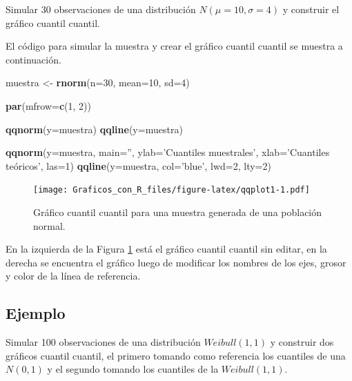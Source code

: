\documentclass[10pt,]{krantz}
\makeatletter
\newenvironment{Shaded}{\begin{snugshade}}{\end{snugshade}}
\newcommand{\KeywordTok}[1]{\textcolor[rgb]{0.13,0.29,0.53}{\textbf{{#1}}}}
\newcommand{\DataTypeTok}[1]{\textcolor[rgb]{0.13,0.29,0.53}{{#1}}}
\newcommand{\DecValTok}[1]{\textcolor[rgb]{0.00,0.00,0.81}{{#1}}}
\newcommand{\StringTok}[1]{\textcolor[rgb]{0.31,0.60,0.02}{{#1}}}
\newcommand{\NormalTok}[1]{{#1}}
\newenvironment{kframe}{%
\medskip{}
\setlength{\fboxsep}{.8em}
 \def\at@end@of@kframe{}%
 \ifinner\ifhmode%
  \def\at@end@of@kframe{\end{minipage}}%
  \begin{minipage}{\columnwidth}%
 \fi\fi%
 \def\FrameCommand##1{\hskip\@totalleftmargin \hskip-\fboxsep
 \colorbox{shadecolor}{##1}\hskip-\fboxsep
     \hskip-\linewidth \hskip-\@totalleftmargin \hskip\columnwidth}%
 \MakeFramed {\advance\hsize-\width
   \@totalleftmargin\z@ \linewidth\hsize
   \@setminipage}}%
 {\par\unskip\endMakeFramed%
 \at@end@of@kframe}
\renewenvironment{Shaded}{\begin{kframe}}{\end{kframe}}
\makeatother
\begin{document}
Simular 30 observaciones de una distribución \(N(\mu=10, \sigma=4)\) y
construir el gráfico cuantil cuantil.

El código para simular la muestra y crear el gráfico cuantil cuantil se
muestra a continuación.

\begin{Shaded}
\begin{Highlighting}[]
\NormalTok{muestra <-}\StringTok{ }\KeywordTok{rnorm}\NormalTok{(}\DataTypeTok{n=}\DecValTok{30}\NormalTok{, }\DataTypeTok{mean=}\DecValTok{10}\NormalTok{, }\DataTypeTok{sd=}\DecValTok{4}\NormalTok{)}

\KeywordTok{par}\NormalTok{(}\DataTypeTok{mfrow=}\KeywordTok{c}\NormalTok{(}\DecValTok{1}\NormalTok{, }\DecValTok{2}\NormalTok{))}

\KeywordTok{qqnorm}\NormalTok{(}\DataTypeTok{y=}\NormalTok{muestra)}
\KeywordTok{qqline}\NormalTok{(}\DataTypeTok{y=}\NormalTok{muestra)}

\KeywordTok{qqnorm}\NormalTok{(}\DataTypeTok{y=}\NormalTok{muestra, }\DataTypeTok{main=}\StringTok{''}\NormalTok{, }\DataTypeTok{ylab=}\StringTok{'Cuantiles muestrales'}\NormalTok{,}
       \DataTypeTok{xlab=}\StringTok{'Cuantiles teóricos'}\NormalTok{, }\DataTypeTok{las=}\DecValTok{1}\NormalTok{)}
\KeywordTok{qqline}\NormalTok{(}\DataTypeTok{y=}\NormalTok{muestra, }\DataTypeTok{col=}\StringTok{'blue'}\NormalTok{, }\DataTypeTok{lwd=}\DecValTok{2}\NormalTok{, }\DataTypeTok{lty=}\DecValTok{2}\NormalTok{)}
\end{Highlighting}
\end{Shaded}

\begin{figure}[htbp]
\centering
\texttt{[image: Graficos\_con\_R\_files/figure-latex/qqplot1-1.pdf]}
\caption{\label{fig:qqplot1}Gráfico cuantil cuantil para una muestra
generada de una población normal.}
\end{figure}

En la izquierda de la Figura \ref{fig:qqplot1} está el gráfico cuantil
cuantil sin editar, en la derecha se encuentra el gráfico luego de
modificar los nombres de los ejes, grosor y color de la línea de
referencia.

\subsection*{Ejemplo}\label{ejemplo-4}


Simular 100 observaciones de una distribución \(Weibull(1,1)\) y
construir dos gráficos cuantil cuantil, el primero tomando como
referencia los cuantiles de una \(N(0,1)\) y el segundo tomando los
cuantiles de la \(Weibull(1,1)\).
\end{document}
